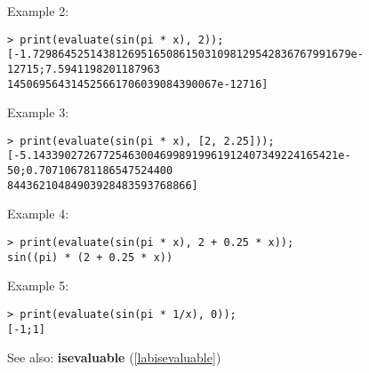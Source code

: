 \noindent Example 2: 
\begin{center}\begin{minipage}{15cm}\begin{Verbatim}[frame=single]
> print(evaluate(sin(pi * x), 2));
[-1.72986452514381269516508615031098129542836767991679e-12715;7.5941198201187963
145069564314525661706039084390067e-12716]
\end{Verbatim}
\end{minipage}\end{center}
\noindent Example 3: 
\begin{center}\begin{minipage}{15cm}\begin{Verbatim}[frame=single]
> print(evaluate(sin(pi * x), [2, 2.25]));
[-5.143390272677254630046998919961912407349224165421e-50;0.707106781186547524400
84436210484903928483593768866]
\end{Verbatim}
\end{minipage}\end{center}
\noindent Example 4: 
\begin{center}\begin{minipage}{15cm}\begin{Verbatim}[frame=single]
> print(evaluate(sin(pi * x), 2 + 0.25 * x));
sin((pi) * (2 + 0.25 * x))
\end{Verbatim}
\end{minipage}\end{center}
\noindent Example 5: 
\begin{center}\begin{minipage}{15cm}\begin{Verbatim}[frame=single]
> print(evaluate(sin(pi * 1/x), 0));
[-1;1]
\end{Verbatim}
\end{minipage}\end{center}
See also: \textbf{isevaluable} (\ref{labisevaluable})
